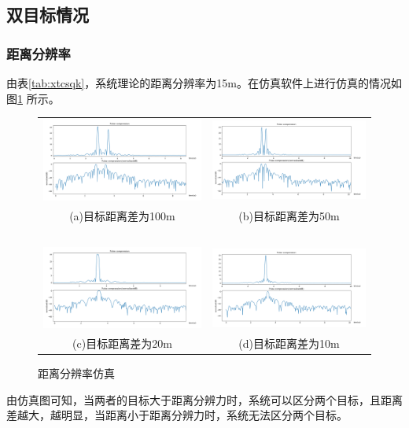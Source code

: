 \documentclass[12pt]{article}
\begin{document}
\subsection{双目标情况}
\subsubsection{距离分辨率}
由表\ref{tab:xtcsqk}，系统理论的距离分辨率为15m。在仿真软件上进行仿真的情况如图\ref{jlfblxh}
所示。
\begin{figure}[htbp]
\centering
\begin{tabular}{cc}
\includegraphics[width=.5\textwidth]{TIM20190916000221}&\includegraphics[width=.5\textwidth]{TIM20190916000337}\\
(a)目标距离差为100m&(b)目标距离差为50m\\
\ &\ \\
\includegraphics[width=.5\textwidth]{TIM20190916002058}&\includegraphics[width=.5\textwidth]{TIM20190916002145}\\
(c)目标距离差为20m&(d)目标距离差为10m\\
\end{tabular}
\caption{距离分辨率仿真}\label{jlfblxh}
\end{figure}\par
由仿真图可知，当两者的目标大于距离分辨力时，系统可以区分两个目标，且距离差越大，越明显，当距离小于距离分辨力时，系统无法区分两个目标。
\end{document}
